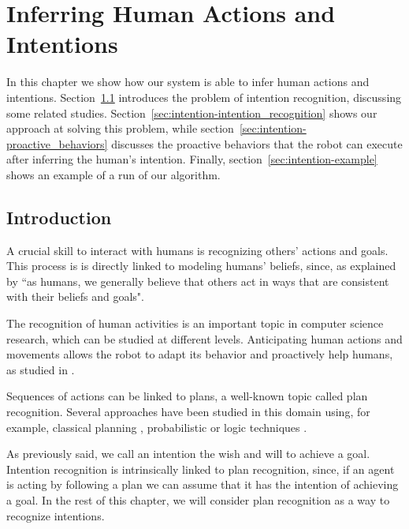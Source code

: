 \chapter{Inferring Human Actions and Intentions} %

\label{chapter:intention} %


In this chapter we show how our system is able to infer human actions and intentions. Section~\ref{sec:intention-intro} introduces the problem of intention recognition, discussing some related studies. Section~\ref{sec:intention-intention_recognition} shows our approach at solving this problem, while section~\ref{sec:intention-proactive_behaviors} discusses the proactive behaviors that the robot can execute after inferring the human's intention.  Finally, section~\ref{sec:intention-example} shows an example of a run of our algorithm.


\section{Introduction}
\label{sec:intention-intro}
A crucial skill to interact with humans is recognizing others' actions and goals. This process is is directly linked to modeling humans' beliefs, since, as explained by \cite{byom2013theory} ``as humans, we generally believe that others act in ways that are consistent with their beliefs and goals". 

The recognition of human activities is an important topic in computer science research, which can be studied at different levels. Anticipating human actions and movements allows the robot to adapt its behavior and proactively help humans, as studied in \cite{koppula2013anticipating}. 

Sequences of actions can be linked to plans, a well-known topic called plan recognition. Several approaches have been studied in this domain using, for example, classical planning \citep{ramirez2009plan}, probabilistic \citep{bui2003general} or logic techniques \citep{singla2011abductive}.

As previously said, we call an intention the wish and will to achieve a goal. Intention recognition is intrinsically linked to plan recognition, since, if an agent is acting by following a plan we can assume that it has the intention of achieving a goal. In the rest of this chapter, we will consider plan recognition as a way to recognize intentions. 

